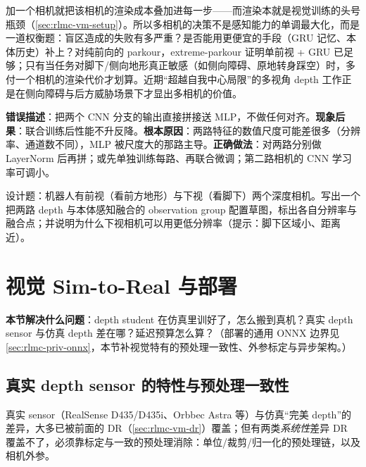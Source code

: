 \begin{insight}\label{ins:rlmc-vm-multicam}
加一个相机就把该相机的渲染成本叠加进每一步——而渲染本就是视觉训练的头号瓶颈（\cref{sec:rlmc-vm-setup}）。所以多相机的决策不是感知能力的单调最大化，而是一道权衡题：盲区造成的失败有多严重？是否能用更便宜的手段（GRU 记忆、本体历史）补上？对纯前向的 parkour，extreme-parkour 证明单前视 + GRU 已足够；只有当任务对脚下/侧向地形真正敏感（如侧向障碍、原地转身踩空）时，多付一个相机的渲染代价才划算。近期“超越自我中心局限”的多视角 depth 工作正是在侧向障碍与后方威胁场景下才显出多相机的价值。
\end{insight}

\begin{pitfall}
\textbf{错误描述}：把两个 CNN 分支的输出直接拼接送 MLP，不做任何对齐。\textbf{现象后果}：联合训练后性能不升反降。\textbf{根本原因}：两路特征的数值尺度可能差很多（分辨率、通道数不同），MLP 被尺度大的那路主导。\textbf{正确做法}：对两路分别做 LayerNorm 后再拼；或先单独训练每路、再联合微调；第二路相机的 CNN 学习率可调小。
\end{pitfall}

\begin{practice}
设计题：机器人有前视（看前方地形）与下视（看脚下）两个深度相机。写出一个把两路 depth 与本体感知融合的 observation group 配置草图，标出各自分辨率与融合点；并说明为什么下视相机可以用更低分辨率（提示：脚下区域小、距离近）。
\end{practice}

\section{视觉 Sim-to-Real 与部署}
\label{sec:rlmc-vm-sim2real}

\textbf{本节解决什么问题}：depth student 在仿真里训好了，怎么搬到真机？真实 depth sensor 与仿真 depth 差在哪？延迟预算怎么算？（部署的通用 ONNX 边界见 \cref{sec:rlmc-priv-onnx}，本节补视觉特有的预处理一致性、外参标定与异步架构。）

\subsection{真实 depth sensor 的特性与预处理一致性}
\label{sec:rlmc-vm-realdepth}

真实 sensor（RealSense D435/D435i、Orbbec Astra 等）与仿真“完美 depth”的差异，大多已被前面的 DR（\cref{sec:rlmc-vm-dr}）覆盖；但有两类\emph{系统性}差异 DR 覆盖不了，必须靠标定与一致的预处理消除：单位/裁剪/归一化的预处理链，以及相机外参。

